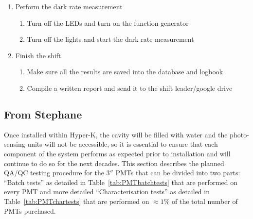 \documentclass[12pt,a4paper]{article}
\newcommand{\inches}{$''$\xspace}
\begin{document}
\begin{enumerate}
\begin{enumerate}
      \item Set all the PMTs to their operational voltage
      \item Do the single PE measurement (should only take about 10 minutes)
      \item Check the results of the single PE measurement
      \item Save the results into the database
      \item Write down the results into the logbook
    \end{enumerate}
    \item Perform the dark rate measurement
    \begin{enumerate}
      \item Turn off the LEDs and turn on the function generator
      \item Turn off the lights and start the dark rate measurement
    \end{enumerate}
    \item Finish the shift
    \begin{enumerate}
      \item Make sure all the results are saved into the database and logbook
      \item Compile a written report and send it to the shift leader/google drive
    \end{enumerate}
\end{enumerate}

\subsection{From Stephane}
Once installed within Hyper-K, the cavity will be filled with water and the photo-sensing units will not be accessible, so it is essential to ensure that each component of the system performs as expected prior to installation and will continue to do so for the next decades. This section describes the planned QA/QC testing procedure for the 3\inches PMTs that can be divided into two parts: ``Batch tests'' as detailed in Table~\ref{tab:PMTbatchtests} that are performed on every PMT and more detailed ``Characterisation tests'' as detailed in Table~\ref{tab:PMTchartests} that are performed on $\approx 1$\% of the total number of PMTs purchased.
\end{document}
